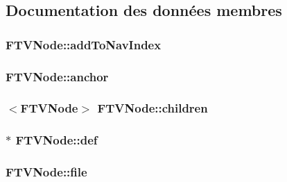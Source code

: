 \subsection{Documentation des données membres}
\hypertarget{struct_f_t_v_node_a53c74b2ed0c6f5e54541fcaf086008ed}{}
\subsubsection[{add\+To\+Nav\+Index}]{ F\+T\+V\+Node\+::add\+To\+Nav\+Index}\label{struct_f_t_v_node_a53c74b2ed0c6f5e54541fcaf086008ed}
\hypertarget{struct_f_t_v_node_a9a78c56961b2ea3b97249a149bced5ad}{}
\subsubsection[{anchor}]{ F\+T\+V\+Node\+::anchor}\label{struct_f_t_v_node_a9a78c56961b2ea3b97249a149bced5ad}
\hypertarget{struct_f_t_v_node_a5e924e9ea4e2d29721bc391b83d5b73a}{}
\subsubsection[{children}]{$<${\bf F\+T\+V\+Node}$>$ F\+T\+V\+Node\+::children}\label{struct_f_t_v_node_a5e924e9ea4e2d29721bc391b83d5b73a}
\hypertarget{struct_f_t_v_node_af7ef22a268ee00d12a6989c89a66823e}{}
\subsubsection[{def}]{$\ast$ F\+T\+V\+Node\+::def}\label{struct_f_t_v_node_af7ef22a268ee00d12a6989c89a66823e}
\hypertarget{struct_f_t_v_node_a9e70cf96146fd5fda79891bdbd45082a}{}
\subsubsection[{file}]{ F\+T\+V\+Node\+::file}\label{struct_f_t_v_node_a9e70cf96146fd5fda79891bdbd45082a}
\hypertarget{struct_f_t_v_node_abc09d6f0f31ec0b09b775da0814ef904}{}
